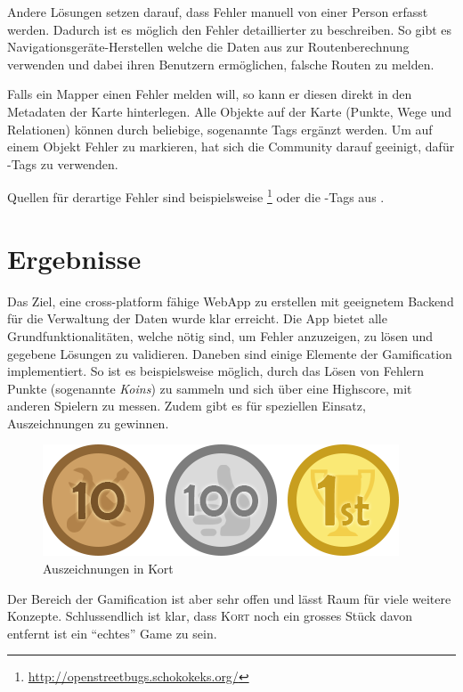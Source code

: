 Andere Lösungen setzen darauf, dass Fehler manuell von einer Person erfasst werden. Dadurch ist es möglich den Fehler detaillierter zu beschreiben. 
So gibt es Navigationsgeräte-Herstellen welche die Daten aus  zur Routenberechnung verwenden und dabei ihren Benutzern ermöglichen, falsche Routen zu melden.

Falls ein \gls{Mapper} einen Fehler melden will, so kann er diesen direkt in den Metadaten der Karte hinterlegen. Alle Objekte auf der Karte (Punkte, Wege und Relationen) können durch beliebige, sogenannte  \glspl{Tag} ergänzt werden.
Um auf einem Objekt Fehler zu markieren, hat sich die Community darauf geeinigt, dafür -\glspl{Tag} zu verwenden.

Quellen für derartige Fehler sind beispielsweise \footnote{\url{http://openstreetbugs.schokokeks.org/}} oder die -\glspl{Tag} aus .

\section*{Ergebnisse}
Das Ziel, eine cross-platform fähige \gls{WebApp} zu erstellen mit geeignetem Backend für die Verwaltung der Daten wurde klar erreicht.
Die App bietet alle Grundfunktionalitäten, welche nötig sind, um Fehler anzuzeigen, zu lösen und gegebene Lösungen zu validieren.
Daneben sind einige Elemente der \gls{Gamification} implementiert. So ist es beispielsweise möglich, durch das Lösen von Fehlern Punkte (sogenannte \emph{Koins}) zu sammeln und sich über eine Highscore, mit anderen Spielern zu messen.
Zudem gibt es für speziellen Einsatz, Auszeichnungen zu gewinnen.

\begin{figure}[H]
	\centering
	\includegraphics[scale=0.6]{images/gamification/gamification-badges}
	\caption{Auszeichnungen in Kort}
	\label{image-kort-badges}
\end{figure}

Der Bereich der \gls{Gamification} ist aber sehr offen und lässt Raum für viele weitere Konzepte. Schlussendlich ist klar, dass \textsc{Kort} noch ein grosses Stück davon entfernt ist ein "`echtes"' Game zu sein.


